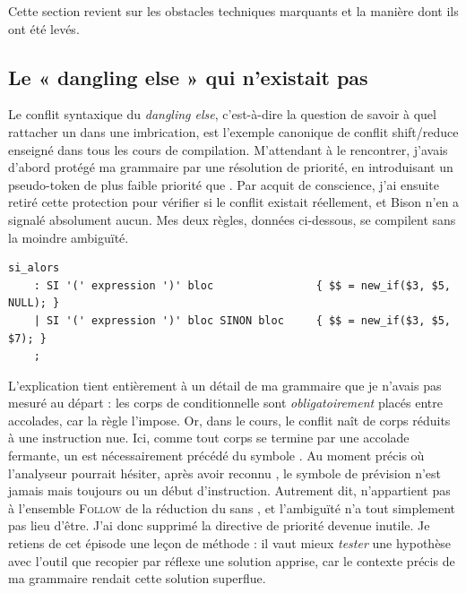 Cette section revient sur les obstacles techniques marquants et la manière dont
ils ont été levés.

\subsection{Le « dangling else » qui n'existait pas}

Le conflit syntaxique du \emph{dangling else}, c'est-à-dire la question de savoir à
quel  rattacher un  dans une imbrication, est l'exemple
canonique de conflit shift/reduce enseigné dans tous les cours de compilation.
M'attendant à le rencontrer, j'avais d'abord protégé ma grammaire par une
résolution de priorité, en introduisant un pseudo-token de plus faible priorité
que . Par acquit de conscience, j'ai ensuite retiré cette protection
pour vérifier si le conflit existait réellement, et Bison n'en a signalé
absolument aucun. Mes deux règles, données ci-dessous, se compilent sans la
moindre ambiguïté.

\begin{lstlisting}[style=gram,caption={Les deux règles du \code{si}, sans aucune directive de priorité.}]
si_alors
    : SI '(' expression ')' bloc                { $$ = new_if($3, $5, NULL); }
    | SI '(' expression ')' bloc SINON bloc     { $$ = new_if($3, $5, $7); }
    ;
\end{lstlisting}

L'explication tient entièrement à un détail de ma grammaire que je n'avais pas
mesuré au départ : les corps de conditionnelle sont \emph{obligatoirement} placés
entre accolades, car la règle  l'impose. Or, dans le cours, le conflit
naît de corps réduits à une instruction nue. Ici, comme tout corps se termine par
une accolade fermante, un  est nécessairement précédé du symbole
\code{\}}. Au moment précis où l'analyseur pourrait hésiter, après avoir reconnu
, le symbole de prévision n'est jamais 
mais toujours \code{\}} ou un début d'instruction. Autrement dit, 
n'appartient pas à l'ensemble \textsc{Follow} de la réduction du  sans
, et l'ambiguïté n'a tout simplement pas lieu d'être. J'ai donc
supprimé la directive de priorité devenue inutile. Je retiens de cet épisode une
leçon de méthode : il vaut mieux \emph{tester} une hypothèse avec l'outil que
recopier par réflexe une solution apprise, car le contexte précis de ma grammaire
rendait cette solution superflue.


